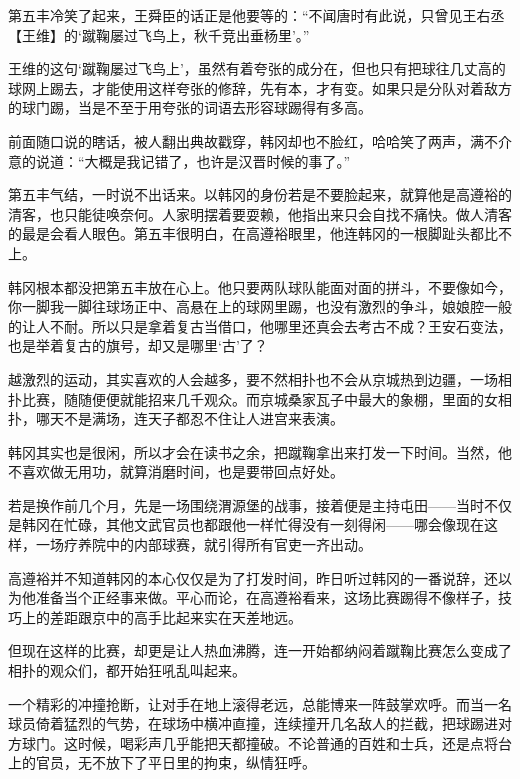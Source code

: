 第五丰冷笑了起来，王舜臣的话正是他要等的：“不闻唐时有此说，只曾见王右丞【王维】的‘蹴鞠屡过飞鸟上，秋千竞出垂杨里’。”

王维的这句‘蹴鞠屡过飞鸟上’，虽然有着夸张的成分在，但也只有把球往几丈高的球网上踢去，才能使用这样夸张的修辞，先有本，才有变。如果只是分队对着敌方的球门踢，当是不至于用夸张的词语去形容球踢得有多高。

前面随口说的瞎话，被人翻出典故戳穿，韩冈却也不脸红，哈哈笑了两声，满不介意的说道：“大概是我记错了，也许是汉晋时候的事了。”

第五丰气结，一时说不出话来。以韩冈的身份若是不要脸起来，就算他是高遵裕的清客，也只能徒唤奈何。人家明摆着要耍赖，他指出来只会自找不痛快。做人清客的最是会看人眼色。第五丰很明白，在高遵裕眼里，他连韩冈的一根脚趾头都比不上。

韩冈根本都没把第五丰放在心上。他只要两队球队能面对面的拼斗，不要像如今，你一脚我一脚往球场正中、高悬在上的球网里踢，也没有激烈的争斗，娘娘腔一般的让人不耐。所以只是拿着复古当借口，他哪里还真会去考古不成？王安石变法，也是举着复古的旗号，却又是哪里‘古’了？

越激烈的运动，其实喜欢的人会越多，要不然相扑也不会从京城热到边疆，一场相扑比赛，随随便便就能招来几千观众。而京城桑家瓦子中最大的象棚，里面的女相扑，哪天不是满场，连天子都忍不住让人进宫来表演。

韩冈其实也是很闲，所以才会在读书之余，把蹴鞠拿出来打发一下时间。当然，他不喜欢做无用功，就算消磨时间，也是要带回点好处。

若是换作前几个月，先是一场围绕渭源堡的战事，接着便是主持屯田——当时不仅是韩冈在忙碌，其他文武官员也都跟他一样忙得没有一刻得闲——哪会像现在这样，一场疗养院中的内部球赛，就引得所有官吏一齐出动。

高遵裕并不知道韩冈的本心仅仅是为了打发时间，昨日听过韩冈的一番说辞，还以为他准备当个正经事来做。平心而论，在高遵裕看来，这场比赛踢得不像样子，技巧上的差距跟京中的高手比起来实在天差地远。

但现在这样的比赛，却更是让人热血沸腾，连一开始都纳闷着蹴鞠比赛怎么变成了相扑的观众们，都开始狂吼乱叫起来。

一个精彩的冲撞抢断，让对手在地上滚得老远，总能博来一阵鼓掌欢呼。而当一名球员倚着猛烈的气势，在球场中横冲直撞，连续撞开几名敌人的拦截，把球踢进对方球门。这时候，喝彩声几乎能把天都撞破。不论普通的百姓和士兵，还是点将台上的官员，无不放下了平日里的拘束，纵情狂呼。

